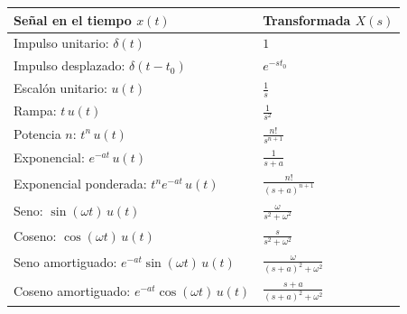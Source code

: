 \begin{center}
	\begin{tabular}{ll}
		\hline
		\textbf{Señal en el tiempo $x(t)$} & \textbf{Transformada $X(s)$} \\
		\hline
		Impulso unitario: $\delta(t)$ & $1$ \\ 
		Impulso desplazado: $\delta(t-t_0)$ & $e^{-st_0}$ \\
		Escalón unitario: $u(t)$ & $\frac{1}{s}$ \\ 
		Rampa: $t \, u(t)$ & $\frac{1}{s^2}$ \\
		Potencia $n$: $t^n \, u(t)$ & $\frac{n!}{s^{n+1}}$ \\
		Exponencial: $e^{-at} \, u(t)$ & $\frac{1}{s+a}$ \\
		Exponencial ponderada: $t^n e^{-at} \, u(t)$ & $\frac{n!}{(s+a)^{n+1}}$ \\
		Seno: $\sin(\omega t) \, u(t)$ & $\frac{\omega}{s^2+\omega^2}$ \\
		Coseno: $\cos(\omega t) \, u(t)$ & $\frac{s}{s^2+\omega^2}$ \\
		Seno amortiguado: $e^{-at}\sin(\omega t) \, u(t)$ & $\frac{\omega}{(s+a)^2+\omega^2}$ \\
		Coseno amortiguado: $e^{-at}\cos(\omega t) \, u(t)$ & $\frac{s+a}{(s+a)^2+\omega^2}$ \\
		\hline
	\end{tabular}
\end{center}